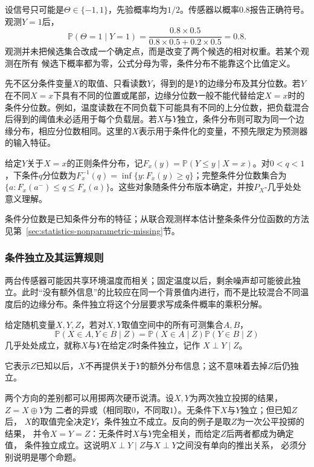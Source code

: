 \begin{example}[有限候选经过带噪观测更新]
\label{ex:probability-finite-candidate-bayes}
设信号只可能是\(\Theta\in\{-1,1\}\)，先验概率均为\(1/2\)。传感器以概率\(0.8\)报告正确符号。观测\(Y=1\)后，
\[ \mathbb{P}(\Theta=1\mid Y=1)
  =\frac{0.8\times0.5}{0.8\times0.5+0.2\times0.5}=0.8. \]
观测并未把候选集合改成一个确定点，而是改变了两个候选的相对权重。若某个观测在所有
候选下概率都为零，公式分母为零，条件分布不能靠这个比值定义。
\end{example}
先不区分条件变量\(X\)的取值、只看读数\(Y\)，得到的是\(Y\)的边缘分布及其分位数。若\(Y\)在不同\(X=x\)下具有不同的位置或尾部，边缘分位数一般不能代替给定\(X=x\)时的条件分位数。例如，温度读数在不同负载下可能具有不同的上分位数，把负载混合后得到的阈值未必适用于每个负载层。若\(X\)与\(Y\)独立，条件分布则可取为同一个边缘分布，相应分位数相同。这里的\(X\)表示用于条件化的变量，不预先限定为预测器的输入特征。
\begin{definition}[条件分位数]
  \label{def:statistics-conditional-quantile}
给定\(Y\)关于\(X=x\)的正则条件分布，记\(F_x(y)=\mathbb P(Y\leq y\mid X=x)\)。对\(0<q<1\)，下条件\(q\)分位数为\(F_x^{-1}(q)=\inf\{y:F_x(y)\geq q\}\)；完整条件分位数集合为\(\{a:F_x(a^-)\leq q\leq F_x(a)\}\)。这些对象随条件分布版本确定，并按\(P_X\)-几乎处处意义理解。
\end{definition}
条件分位数是已知条件分布的特征；从联合观测样本估计整条条件分位函数的方法见第~\ref{sec:statistics-nonparametric-missing}节。

\subsubsection{条件独立及其运算规则}
两台传感器可能因共享环境温度而相关；固定温度以后，剩余噪声却可能彼此独立。此时“没有额外信息”的比较应在同一个背景值内进行，而不是比较混合不同温度后的边缘分布。条件独立将这个分层要求写成条件概率的乘积分解。
\begin{definition}[条件独立]
  \label{def:probability-conditional-independence}
  给定随机变量\(X,Y,Z\)，若对\(X,Y\)取值空间中的所有可测集合\(A,B\)，
\[ \mathbb{P}(X\in A,Y\in B\mid Z)
  =\mathbb{P}(X\in A\mid Z)\mathbb{P}(Y\in B\mid Z) \]
几乎处处成立，就称\(X\)与\(Y\)在给定\(Z\)时条件独立，记作
\(X\perp Y\mid Z\)。
\end{definition}
它表示\(Z\)已知以后，\(X\)不再提供关于\(Y\)的额外分布信息；这不意味着去掉\(Z\)后仍独立。

两个方向的差别都可以用掷两次硬币说清。设\(X,Y\)为两次独立投掷的结果，\(Z=X\oplus Y\)为
二者的异或（相同取\(0\)，不同取\(1\)）。无条件下\(X\)与\(Y\)独立；但已知\(Z\)后，
\(X\)的取值完全决定\(Y\)，条件独立不成立。反向的例子是取\(Z\)为一次公平投掷的结果，
并令\(X=Y=Z\)：无条件时\(X\)与\(Y\)完全相关，而给定\(Z\)后两者都成为确定值，
条件独立成立。这说明\(X\perp Y\mid Z\)与\(X\perp Y\)之间没有单向的推出关系，
必须分别说明是哪个命题。

